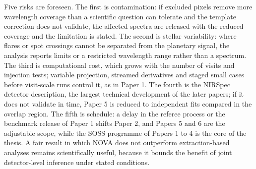 Five risks are foreseen. The first is contamination: if excluded pixels
remove more wavelength coverage than a scientific question can tolerate
and the template correction does not validate, the affected spectra are
released with the reduced coverage and the limitation is stated. The
second is stellar variability: where flares or spot crossings cannot be
separated from the planetary signal, the analysis reports limits or a
restricted wavelength range rather than a spectrum. The third is
computational cost, which grows with the number of visits and injection
tests; variable projection, streamed derivatives and staged small cases
before visit-scale runs control it, as in Paper 1. The fourth is the
NIRSpec detector description, the largest technical development of the
later papers; if it does not validate in time, Paper 5 is reduced to
independent fits compared in the overlap region. The fifth is schedule: a
delay in the referee process or the benchmark release of Paper 1 shifts
Paper 2, and Papers 5 and 6 are the adjustable scope, while the SOSS
programme of Papers 1 to 4 is the core of the thesis. A fair result in
which NOVA does not outperform extraction-based analyses remains
scientifically useful, because it bounds the benefit of joint
detector-level inference under stated conditions.
